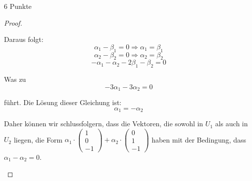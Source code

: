 \documentclass{problemset}
\begin{document}
\begin{problem}{6 Punkte}
\begin{proof}
\begin{enumerate}
              Daraus folgt:
              \[
                  \alpha_1 - \beta_1 = 0 \Rightarrow \alpha_1 = \beta_1
              \]
              \[
                  \alpha_2 - \beta_2 = 0 \Rightarrow \alpha_2 = \beta_2
              \]
              \[
                  -\alpha_1 - \alpha_2 - 2\beta_1 - \beta_2 = 0
              \]

              Was zu
              \[
                  -3\alpha_1 -3\alpha_2 = 0
              \]

              führt. Die Lösung dieser Gleichung ist:
              \[
                  \alpha_1 = -\alpha_2
              \]

              Daher können wir schlussfolgern, dass die Vektoren, die sowohl in \(U_1\) als
              auch in \(U_2\) liegen, die Form \(\alpha_1 \cdot \begin{pmatrix}
                  1 \\
                  0 \\
                  -1
              \end{pmatrix} + \alpha_2 \cdot \begin{pmatrix}
                  0 \\
                  1 \\
                  -1
              \end{pmatrix}\) haben mit der Bedingung, dass \(\alpha_1 - \alpha_2 = 0\).
    \end{enumerate}
\end{proof}
\end{problem}
\end{document}
